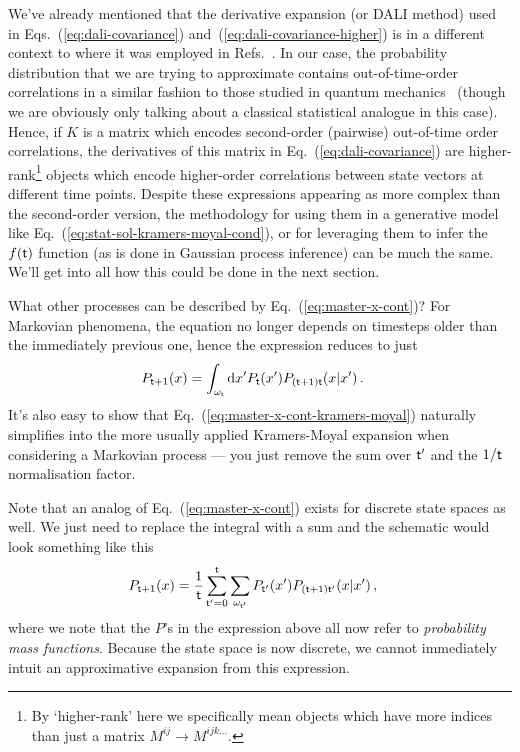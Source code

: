 We've already mentioned that the derivative expansion (or DALI method) used in Eqs.~(\ref{eq:dali-covariance}) and~(\ref{eq:dali-covariance-higher}) is in a different context to where it was employed in Refs.~\cite{sellentin2014breaking, dali}. In our case, the probability distribution that we are trying to approximate contains out-of-time-order correlations in a similar fashion to those studied in quantum mechanics~\cite{hashimoto2017out,García-Mata:2023} (though we are obviously only talking about a classical statistical analogue in this case). Hence, if $K$ is a matrix which encodes second-order (pairwise) out-of-time order correlations, the derivatives of this matrix in Eq.~(\ref{eq:dali-covariance}) are higher-rank\footnote{By `higher-rank' here we specifically mean objects which have more indices than just a matrix $M^{ij}\rightarrow M^{ijk\dots}$.} objects which encode higher-order correlations between state vectors at different time points. Despite these expressions appearing as more complex than the second-order version, the methodology for using them in a generative model like Eq.~(\ref{eq:stat-sol-kramers-moyal-cond}), or for leveraging them to infer the $f({\sf t})$ function (as is done in Gaussian process inference) can be much the same. We'll get into all how this could be done in the next section. 

What other processes can be described by Eq.~(\ref{eq:master-x-cont})? For Markovian phenomena, the equation no longer depends on timesteps older than the immediately previous one, hence the expression reduces to just
\begin{align}
P_{{\sf t}+1}(x) &= \int_{\omega_{\sf t}}{\rm d}x' P_{\sf t}(x') P_{({\sf t}+1){\sf t}}(x\vert x') \label{eq:master-x-cont-markov} \,.
\end{align}
It's also easy to show that Eq.~(\ref{eq:master-x-cont-kramers-moyal}) naturally simplifies into the more usually applied Kramers-Moyal expansion when considering a Markovian process --- you just remove the sum over ${\sf t}'$ and the $1/{\sf t}$ normalisation factor. 

Note that an analog of Eq.~(\ref{eq:master-x-cont}) exists for discrete state spaces as well. We just need to replace the integral with a sum and the schematic would look something like this
\begin{align}
P_{{\sf t}+1}(x) &= \frac{1}{{\sf t}}\sum_{{\sf t}'=0}^{\sf t}\sum_{\omega_{{\sf t}'}} P_{{\sf t}'}(x') P_{({\sf t}+1){\sf t}'}(x \vert x') \label{eq:master-x-disc} \,,
\end{align}
where we note that the $P$'s in the expression above all now refer to \emph{probability mass functions}. Because the state space is now discrete, we cannot immediately intuit an approximative expansion from this expression. 

